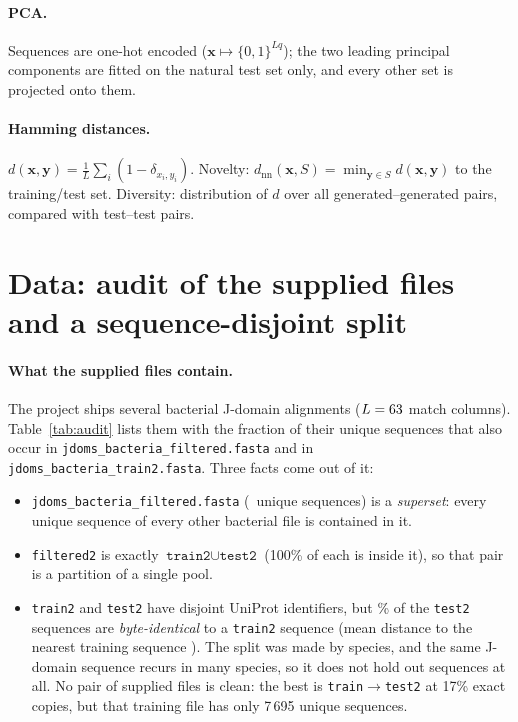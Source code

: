 \documentclass[10pt,a4paper]{article}
\begin{document}
\paragraph{PCA.} Sequences are one-hot encoded ($\bm x\mapsto\{0,1\}^{Lq}$); the two leading
principal components are fitted on the natural test set only, and every other set is projected
onto them.

\paragraph{Hamming distances.} $d(\bm x,\bm y)=\frac1L\sum_i(1-\delta_{x_i,y_i})$.
Novelty: $d_\text{nn}(\bm x,S)=\min_{\bm y\in S}d(\bm x,\bm y)$ to the training/test set.
Diversity: distribution of $d$ over all generated--generated pairs, compared with test--test pairs.

\section{Data: audit of the supplied files and a sequence-disjoint split}\label{sec:data}

\paragraph{What the supplied files contain.} The project ships several bacterial J-domain
alignments ($L=63$ match columns). Table~\ref{tab:audit} lists them with the fraction of their
unique sequences that also occur in \texttt{jdoms\_bacteria\_filtered.fasta} and in
\texttt{jdoms\_bacteria\_train2.fasta}. Three facts come out of it:
\begin{itemize}\itemsep0pt
\item \texttt{jdoms\_bacteria\_filtered.fasta} (\NsuperSet\ unique sequences) is a \emph{superset}:
      every unique sequence of every other bacterial file is contained in it.
\item \texttt{filtered2} is exactly $\texttt{train2}\cup\texttt{test2}$ (100\% of each is inside it),
      so that pair is a partition of a single pool.
\item \texttt{train2} and \texttt{test2} have disjoint UniProt identifiers, but
      \OrigCopies\% of the \texttt{test2} sequences are \emph{byte-identical} to a \texttt{train2}
      sequence (mean distance to the nearest training sequence \OrigNN). The split was made by
      species, and the same J-domain sequence recurs in many species, so it does not hold out
      sequences at all. No pair of supplied files is clean: the best is
      \texttt{train}$\to$\texttt{test2} at 17\% exact copies, but that training file has only
      7\,695 unique sequences.
\end{itemize}
\end{document}
